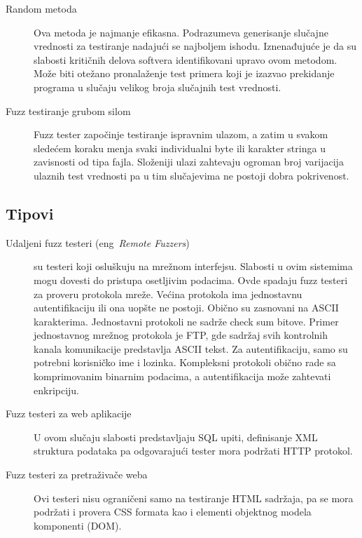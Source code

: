\documentclass[a4paper]{article}
\begin{document}
{\begin{description}
\item[Random metoda]
Ova metoda je najmanje efikasna. Podrazumeva generisanje slučajne vrednosti za testiranje nadajući se najboljem ishodu. Iznenađujuće je da su slabosti kritičnih delova softvera identifikovani upravo ovom metodom. Može biti otežano pronalaženje test primera koji je izazvao prekidanje programa u slučaju velikog broja slučajnih test vrednosti. 
\\

\item[Fuzz testiranje grubom silom]
Fuzz tester započinje testiranje ispravnim ulazom, a zatim u svakom sledećem koraku menja svaki individualni byte ili karakter stringa u zavisnosti od tipa fajla. Složeniji ulazi zahtevaju ogroman broj varijacija ulaznih test vrednosti pa u tim slučajevima ne postoji dobra pokrivenost.
\end{description}

\subsection{Tipovi}
\label{subsec:tipovi_fuzz_testiranja}
\begin{description}
\item[Udaljeni fuzz testeri  (eng~{\em Remote Fuzzers}) ] su testeri koji osluškuju na mrežnom interfejsu. Slabosti u ovim sistemima mogu dovesti do pristupa osetljivim podacima. Ovde spadaju fuzz testeri za proveru protokola mreže. Većina protokola ima jednostavnu autentifikaciju ili ona uopšte ne postoji. Obično su zasnovani na ASCII karakterima. Jednostavni protokoli ne sadrže check sum bitove. Primer jednostavnog mrežnog protokola je FTP, gde sadržaj svih kontrolnih kanala komunikacije predstavlja ASCII tekst. Za autentifikaciju, samo su potrebni korisničko ime i lozinka. Kompleksni protokoli obično rade sa komprimovanim binarnim podacima, a autentifikacija može zahtevati enkripciju.
\\

\item[Fuzz testeri za web aplikacije] 
U ovom slučaju slabosti predstavljaju SQL upiti, definisanje XML struktura podataka pa odgovarajući tester mora podržati HTTP protokol.
\\

\item[Fuzz testeri za pretraživače weba]
Ovi testeri nisu ograničeni samo na testiranje HTML sadržaja, pa se mora podržati i provera CSS formata kao i elementi objektnog modela komponenti (DOM).
\\


\end{description}}
\end{document}
